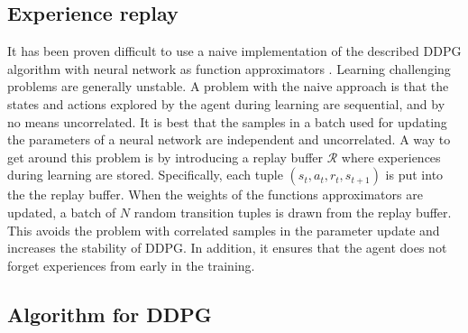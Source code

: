 \documentclass[class=book, crop=false]{standalone}
\begin{document}
\subsection{Experience replay}
It has been proven difficult to use a naive implementation of the described DDPG algorithm with neural network as function approximators \cite{DBLP:journals/corr/LillicrapHPHETS15}. Learning challenging problems are generally unstable. A problem with the naive approach is that the states and actions explored by the agent during learning are sequential, and by no means uncorrelated. It is best that the samples in a batch used for updating the parameters of a neural network are independent and uncorrelated. A way to get around this problem is by introducing a replay buffer $\mathcal{R}$ where experiences during learning are stored. Specifically, each tuple $(s_{t},a_{t},r_{t},s_{t+1})$ is put into the the replay buffer. When the weights of the functions approximators are updated, a batch of $N$ random transition tuples is drawn from the replay buffer. This avoids the problem with correlated samples in the parameter update and increases the stability of DDPG. In addition, it ensures that the agent does not forget experiences from early in the training. 

\subsection{Algorithm for DDPG}
\end{document}

